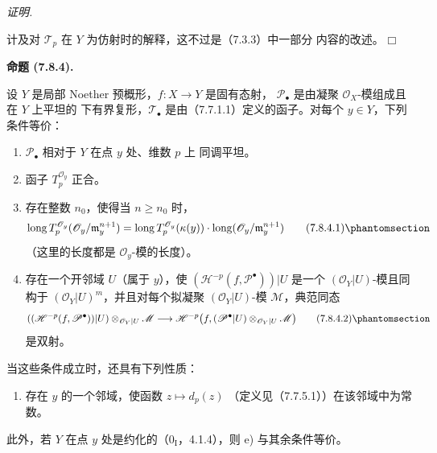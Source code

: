 \documentclass[UTF8,fontset=none,11pt,oneside,openany]{ctexbook}
\providecommand{\square}{\mdlgwhtsquare}
\newenvironment{proposition}[1][]{%
  \par\medskip\noindent\textbf{命题 (#1).}\ %
}{\par}
\newenvironment{proof}{%
  \par\smallskip\noindent\textit{证明.}\ %
}{\hfill$\square$\par}
\let\EGAOriginalLabel\label
\renewcommand{\label}[1]{\phantomsection\EGAOriginalLabel{#1}}
\begin{document}
\begin{proof}
计及对 $\mathscr T_p$ 在 $Y$ 为仿射时的解释，这不过是（7.3.3）中一部分
内容的改述。
\end{proof}

\begin{proposition}[7.8.4]
设 $Y$ 是局部 Noether 预概形，$f:X\to Y$ 是固有态射，
$\mathscr P_\bullet$ 是由凝聚 $\mathscr O_X$-模组成且在 $Y$ 上平坦的
下有界复形，$\mathscr T_\bullet$ 是由（7.7.1.1）定义的函子。对每个
$y\in Y$，下列条件等价：
\begin{enumerate}
  \item[a)] $\mathscr P_\bullet$ 相对于 $Y$ 在点 $y$ 处、维数 $p$ 上
    同调平坦。
  \item[b)] 函子 $T_p^{\mathscr O_y}$ 正合。
  \item[c)] 存在整数 $n_0$，使得当 $n\geq n_0$ 时，
    \[
      \operatorname{long}T_p^{\mathscr O_y}
        (\mathscr O_y/\mathfrak m_y^{n+1})
      =
      \operatorname{long}T_p^{\mathscr O_y}(\kappa(y))
      \cdot
      \operatorname{long}(\mathscr O_y/\mathfrak m_y^{n+1})
      \tag{7.8.4.1}\label{III.7.8.4.1.fr}
    \]
    （这里的长度都是 $\mathscr O_y$-模的长度）。
  \item[d)] 存在一个开邻域 $U$（属于 $y$），使
    $(\mathscr H^{-p}(f,\mathscr P^\bullet))|U$ 是一个
    $(\mathscr O_Y|U)$-模且同构于 $(\mathscr O_Y|U)^m$，并且对每个拟凝聚
    $(\mathscr O_Y|U)$-模 $\mathscr M$，典范同态
    \[
      ((\mathscr H^{-p}(f,\mathscr P^\bullet))|U)
      \otimes_{\mathscr O_Y|U}\mathscr M
      \longrightarrow
      \mathscr H^{-p}
      \bigl(
        f,(\mathscr P^\bullet|U)
          \otimes_{\mathscr O_Y|U}\mathscr M
      \bigr)
      \tag{7.8.4.2}\label{III.7.8.4.2.fr}
    \]
    是双射。
\end{enumerate}
当这些条件成立时，还具有下列性质：
\begin{enumerate}
  \item[e)] 存在 $y$ 的一个邻域，使函数 $z\mapsto d_p(z)$
    （定义见（7.7.5.1））在该邻域中为常数。
\end{enumerate}
此外，若 $Y$ 在点 $y$ 处是约化的（$0_{\mathrm I}$，4.1.4），则 e)
与其余条件等价。
\end{proposition}
\end{document}
